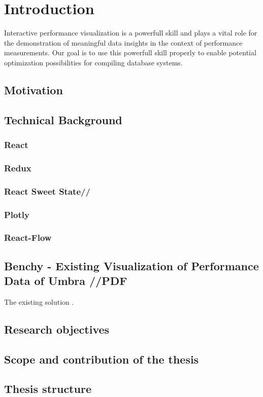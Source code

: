 
\chapter{Introduction}\label{chapter:introduction}
Interactive performance visualization is a powerfull skill and plays a vital role for the demonstration of meaningful data insights in the context of performance measurements. Our goal is to use this powerfull skill properly to enable potential optimization possibilities for compiling database systems.

\section{Motivation}
\section{Technical Background}
\subsection{React}
\subsection{Redux}
\subsection{React Sweet State//}
\subsection{Plotly}
\subsection{React-Flow}
\section{Benchy - Existing Visualization of Performance Data of Umbra //PDF }\label{sec:benchy}
The existing solution \parencite*{benchy}.

\section{Research objectives}
\section{Scope and contribution of the thesis}
\section{Thesis structure}


